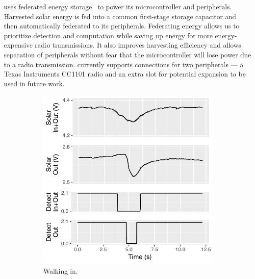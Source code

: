 \sysname uses federated energy storage~\cite{jhester:ufop:sensys} to power its microcontroller and peripherals.
Harvested solar energy is fed into a common first-stage storage capacitor and then automatically federated to its peripherals.
Federating energy allows us to prioritize detection and computation while saving up energy for more energy-expensive radio transmissions.
It also improves harvesting efficiency and allows separation of peripherals without fear that the microcontroller will lose power due to a radio transmission.
\sysname currently supports connections for two peripherals --- a Texas Instruments CC1101 radio and an extra slot for potential expansion to be used in future work.
\begin{figure}[t]
	\centering
	\begin{subfigure}[b]{0.5\textwidth}
		\centering
		\includegraphics[width=\columnwidth]{figs/tracesin.pdf}
		\caption{Walking in.}
		\label{fig:tracesin}
	\end{subfigure}%
	\begin{subfigure}[b]{0.5\textwidth}
		\centering

\end{subfigure}
\end{figure}
